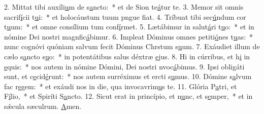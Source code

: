 2. Mittat tibi auxíli\uline{u}m de s\uline{a}ncto:~* et de Sion te\uline{á}tur te.
3. Memor sit omnis sacrif\uline{í}cii t\uline{u}i:~* et holocáustum tuum pngue f\uline{i}at.
4. Tríbuat tibi sec\uline{ú}ndum cor t\uline{u}um:~* et omne consílium tum conf\uline{í}rmet.
5. Lætábimur in salut\uline{á}ri t\uline{u}o:~* et in nómine Dei nostri magnfic\uline{á}bimur.
6. Impleat Dóminus omnes petiti\uline{ó}nes t\uline{u}as:~* nunc cognóvi quóniam salvum fecit Dóminus Chrstum s\uline{u}um.
7. Exáudiet illum de cælo s\uline{a}ncto s\uline{u}o:~* in potentátibus salus déxtræ \uline{e}jus.
8. Hi in cúrribus, et h\uline{i} in \uline{e}quis:~* nos autem in nómine Dómini, Dei nostri nvoc\uline{á}bimus.
9. Ipsi obligáti sunt, et c\uline{e}cid\uline{é}runt:~* nos autem surréximus et ercti s\uline{u}mus.
10. Dómine s\uline{a}lvum fac r\uline{e}gem:~* et exáudi nos in die, qua invocavrim\uline{u}s te.
11. Glória P\uline{a}tri, et F\uline{í}lio,~* et Spiríti S\uline{a}ncto.
12. Sicut erat in princípio, et n\uline{u}nc, et s\uline{e}mper,~* et in sǽcula sæculrum. \uline{A}men.
